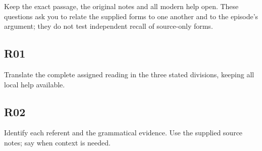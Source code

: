 Keep the exact passage, the original notes and all modern help open. These questions ask you to relate the supplied forms to one another and to the episode’s argument; they do not test independent recall of source-only forms.

\subsection*{R01}

Translate the complete assigned reading in the three stated divisions, keeping all local help available.




\subsection*{R02}

Identify each referent and the grammatical evidence. Use the supplied source notes; say when context is needed.





